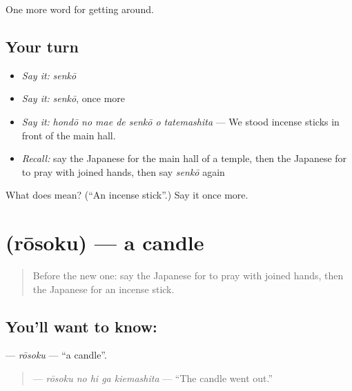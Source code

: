 \begin{grammarlens}[title={What you've built}]
One more word for getting around.
\end{grammarlens}

\subsection*{Your turn}
\begin{itemize}
\raggedright
  \item \emph{Say it:} \emph{senkō}
  \item \emph{Say it:} \emph{senkō}, once more
  \item \emph{Say it:} \emph{hondō no mae de senkō o tatemashita} — We stood incense sticks in front of the main hall.
  \item \emph{Recall:} say the Japanese for the main hall of a temple, then the Japanese for to pray with joined hands, then say \emph{senkō} again
\end{itemize}

\begin{tcolorbox}[breakable,colback=teal!4,colframe=teal!35!black,title={Before you move on}]
What does  mean? (\textquotedblleft{}An incense stick\textquotedblright{}.) Say it once more.
\end{tcolorbox}
\section[\texorpdfstring{\ja{ろうそく} (rōsoku)}{ろうそく (rōsoku)}]{ (rōsoku) — a candle}

\label{lesson:JA-C408-rousoku}



\begin{quote}
Before the new one: say the Japanese for to pray with joined hands, then the Japanese for an incense stick.
\end{quote}

\subsection*{You'll want to know: }
\textbf{} — \emph{rōsoku} — \textquotedblleft{}a candle\textquotedblright{}.

\begin{quote}
\textbf{  } — \emph{rōsoku no hi ga kiemashita} — \textquotedblleft{}The candle went out.\textquotedblright{}
\end{quote}


